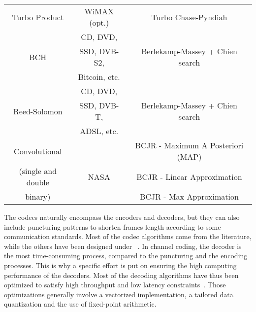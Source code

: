 \begin{table}[htp]
\begin{tabular}{ c | c | c }
  \multirow{2}{*}{{Turbo Product}}        & \multirow{2}{*}{WiMAX (opt.)}       & \multirow{2}{*}{Turbo Chase-Pyndiah}   \\
                                          &                                     &                                        \\
  \hline
  \multirow{3}{*}{{BCH}}                  & CD, DVD,                            &                                        \\
                                          & SSD, DVB-S2,                        & Berlekamp-Massey + Chien search        \\
                                          & Bitcoin, etc.                       &                                        \\
  \hline
  \multirow{3}{*}{{Reed-Solomon}}         & CD, DVD,                            &                                        \\
                                          & SSD, DVB-T,                         & Berlekamp-Massey + Chien search        \\
                                          & ADSL, etc.                          &                                        \\
  \hline
  \multirow{1}{*}{{Convolutional}}        &                                     & BCJR - Maximum A Posteriori (MAP)      \\
  (single and double                      & NASA                                & BCJR - Linear Approximation            \\
  binary)                                 &                                     & BCJR - Max Approximation               \\
  \end{tabular}
\end{table}

The codecs naturally encompass the encoders and decoders, but they can also
include puncturing patterns to shorten frames length according to some
communication standards. Most of the codec algorithms come from the literature,
while the others have been designed under
\AFFECT~\cite{Tonnellier2016a,Tonnellier2016b,Tonnellier2017,Leonardon2019}.
In channel coding, the decoder is the most time-consuming process, compared to
the puncturing and the encoding processes. This is why a specific effort is put
on ensuring the high computing performance of the decoders. Most of the decoding
algorithms have thus been optimized to satisfy high throughput and low latency
constraints~\cite{LeGal2015a,Cassagne2015c,Cassagne2016a,Cassagne2016b}. Those
optimizations generally involve a vectorized implementation, a tailored data
quantization and the use of fixed-point arithmetic.

